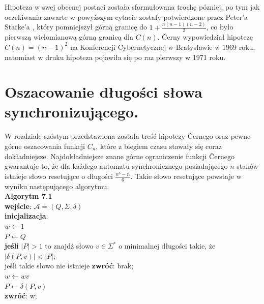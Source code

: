 \documentclass[12pt,a4paper]{article}
\begin{document}
Hipoteza w swej obecnej postaci zosta{\l}a sformu{\l}owana troch\k{e} p\'ozniej, po tym jak oczekiwania zawarte w powy\.zszym cytacie zosta{\l}y potwierdzone przez Peter'a Starke'a \cite{4}, kt\'ory pomniejszy{\l} g\'orn\k{a} granic\k{e} do $1+\frac{n(n-1)(n-2)}{2}$, co by{\l}o pierwsz\k{a} wielomianow\k{a} g\'orn\k{a} granic\k{a} dla $C(n)$. \v Cerny wypowiedzia{\l} hipotez\k{e} $C(n)=(n-1)^{2}$ na Konferencji Cybernetycznej  w Bratys{\l}awie w 1969 roku, natomiast w druku hipoteza pojawi{\l}a si\k{e} po raz pierwszy w 1971 roku.


\section{Oszacowanie d{\l}ugo\'{s}ci s{\l}owa synchronizuj\k{a}cego.}

W rozdziale sz\'ostym przedstawiona zosta{\l}a tre\'s\'c hipotezy \v Cernego oraz pewne g\'orne oszacowania funkcji $C_{n}$, kt\'ore z  biegiem czasu stawa{\l}y si\k{e} coraz dok{\l}adniejsze. Najdok{\l}adniejsze znane g\'orne ograniczenie funkcji \v Cernego gwarantuje to, \.ze dla ka\.zdego automatu synchronicznego posiadaj\k{a}cego $n$ stan\'ow istnieje s{\l}owo resetuj\k{a}ce o d{\l}ugo\'sci $\frac{n^{3}-n}{6}$. Takie s{\l}owo resetuj\k{a}ce powstaje w wyniku nast\k{e}puj\k{a}cego algorytmu.\\


\textbf{Algorytm 7.1}\\ 
\textbf{wej\'scie}: $\mathscr{A}=(Q, \Sigma, \delta)$\\
\textbf{inicjalizacja}: \\
$w\leftarrow 1$\\ 
$P\leftarrow Q$\\
\textbf{je\'sli} $|P|>1$ to znajd\'z s{\l}owo $v\in\Sigma^{*}$ o minimalnej d{\l}ugo\'sci takie, \.ze $|\delta(P,v)|<|P|$;\\
je\'sli takie s{\l}owo nie istnieje \textbf{zwr\'o\'c}: brak;\\
$w\leftarrow wv$\\ 
$P\leftarrow \delta(P,v)$\\
\textbf{zwr\'o\'c}: w;\\
\end{document}
